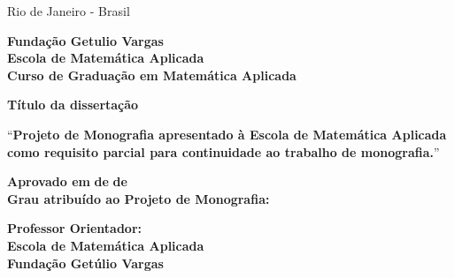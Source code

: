 \documentclass[12pt]{article}
\begin{document}
\par
\vfill
\begin{center}
{{\normalsize Rio de Janeiro - Brasil}\\
{\normalsize \the\year}}
\end{center}

\thispagestyle{empty}

\newpage
\begin{center}
\textbf{\LARGE Fundação Getulio Vargas}\\ 
\textbf{\LARGE Escola de Matemática Aplicada}\\
\textbf{\LARGE Curso de Graduação em Matemática Aplicada}

\par
\vspace{100pt}
\textbf{\Large Título da dissertação}


\par
\vspace{65pt}

``\textbf{Projeto de Monografia apresentado à Escola de Matemática Aplicada como requisito parcial para continuidade ao trabalho de monografia.}''
\end{center}

\par
\vspace{65pt}
\begin{center}

\textbf{Aprovado em } \makebox[30pt]{\hrulefill}\textbf{ de }\makebox[120pt]{\hrulefill}\textbf{ de }\makebox[50pt]{\hrulefill}
\\
\vspace{5pt}
\textbf{Grau atribuído ao Projeto de Monografia:} \makebox[30pt]{\hrulefill}\\
\end{center}


\par
\vspace{40pt}
\begin{center}

\hrulefill

\vspace{5pt}
\textbf{Professor Orientador: }\\
\textbf{Escola de Matemática Aplicada}\\
\textbf{Fundação Getúlio Vargas}
\end{center}

\thispagestyle{empty}


\newpage
\tableofcontents
\thispagestyle{empty}
\end{document}
